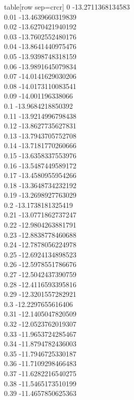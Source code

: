   table[row sep=crcr]{%
0	-13.2711368134583\\
0.01	-13.4639660319839\\
0.02	-13.6270421940192\\
0.03	-13.7602552480176\\
0.04	-13.8641440975476\\
0.05	-13.9398748318159\\
0.06	-13.9891645079834\\
0.07	-14.0141629030206\\
0.08	-14.0173110083541\\
0.09	-14.001196338066\\
0.1	-13.9684218850392\\
0.11	-13.9214996798438\\
0.12	-13.8627735627831\\
0.13	-13.7943705752708\\
0.14	-13.7181770260666\\
0.15	-13.6358337553976\\
0.16	-13.5487449589172\\
0.17	-13.4580955954266\\
0.18	-13.3648734232192\\
0.19	-13.2698927763029\\
0.2	-13.1738181325419\\
0.21	-13.0771862737247\\
0.22	-12.9804263881791\\
0.23	-12.8838778460688\\
0.24	-12.7878056224978\\
0.25	-12.6924134898523\\
0.26	-12.5978551786676\\
0.27	-12.5042437390759\\
0.28	-12.4116593395816\\
0.29	-12.3201557282921\\
0.3	-12.2297655616406\\
0.31	-12.1405047820509\\
0.32	-12.0523762019307\\
0.33	-11.9653724285467\\
0.34	-11.8794782436003\\
0.35	-11.7946725330187\\
0.36	-11.7109298466483\\
0.37	-11.6282216540275\\
0.38	-11.5465173510199\\
0.39	-11.4657850625363\\
}
